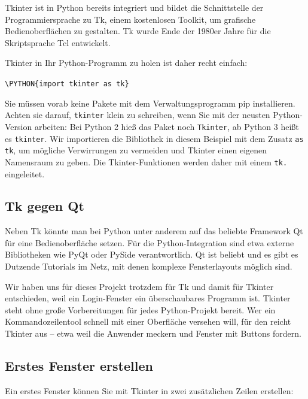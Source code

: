 Tkinter ist in Python bereits integriert und bildet die Schnittstelle der Programmiersprache zu Tk, einem kostenlosen Toolkit, um grafische Bedienoberflächen zu gestalten. Tk wurde Ende der 1980er Jahre für die Skriptsprache Tcl entwickelt.

Tkinter in Ihr Python-Programm zu holen ist daher recht einfach:

\medskip

\texttt{\textbackslash PYTHON\{import tkinter as tk\}}

\medskip

Sie müssen vorab keine Pakete mit dem Verwaltungsprogramm pip installieren. Achten sie darauf, \texttt{tkinter} klein zu schreiben, wenn Sie mit der neusten Python-Version arbeiten: Bei Python 2 hieß das Paket noch \texttt{Tkinter}, ab Python 3 heißt es \texttt{tkinter}. Wir importieren die Bibliothek in diesem Beispiel mit dem Zusatz \texttt{as tk}, um mögliche Verwirrungen zu vermeiden und Tkinter einen eigenen Namensraum zu geben. Die Tkinter-Funktionen werden daher mit einem \texttt{tk.} eingeleitet.


\subsection{Tk gegen Qt}

Neben Tk könnte man bei Python unter anderem auf das beliebte Framework Qt für eine Bedienoberfläche setzen. Für die Python-Integration sind etwa externe Bibliotheken wie PyQt oder PySide verantwortlich. Qt ist beliebt und es gibt es Dutzende Tutorials im Netz, mit denen komplexe Fensterlayouts möglich sind.

Wir haben uns für dieses Projekt trotzdem für Tk und damit für Tkinter entschieden, weil ein Login-Fenster ein überschaubares Programm ist. Tkinter steht ohne große Vorbereitungen für jedes Python-Projekt bereit. Wer ein Kommandozeilentool schnell mit einer Oberfläche versehen will, für den reicht Tkinter aus – etwa weil die Anwender meckern und Fenster mit Buttons fordern.


\subsection{Erstes Fenster erstellen}

Ein erstes Fenster können Sie mit Tkinter in zwei zusätzlichen Zeilen erstellen:

